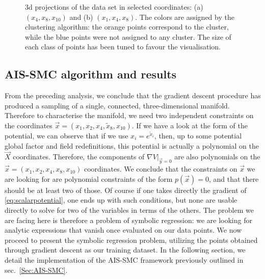 \documentclass[11pt,a4paper]{article}
\begin{document}
\begin{figure}
{
		}
		\subfigure{\label{fig:3dx1x4x8}}
		\caption{3d projections of the data set in selected coordinates: (a) $(x_4, x_8, x_{10})$ and (b) $(x_1, x_4, x_8)$. The colors are assigned by the clustering algorithm: the orange points correspond to the cluster, while the blue points were not assigned to any cluster. The size of each class of points has been tuned to favour the visualisation.}
		\label{fig:3dplots}
	\end{figure}


	\subsection{AIS-SMC algorithm and results}  \label{sec:AIS-SMC_application}
	From the preceding analysis, we conclude that the gradient descent procedure has produced a sampling of a single, connected, three-dimensional manifold. Therefore to characterise the manifold, we need two independent constraints on the coordinates $\vec{x} = (x_1,x_2,x_4,\tilde{x}_8,x_{10})$. If we have a look at the form of the potential, we can observe that if we use $x_{i} = e^{\tilde{x}_i}$, then, up to some potential global factor and field redefinitions, this potential is actually a polynomial on the $\vec{X}$ coordinates. Therefore, the components of $\left.\nabla V\right|_{\vec{y}=0}$ are also polynomials on the $\vec{x} = (x_1,x_2,x_4,x_8,x_{10})$ coordinates. We conclude that the constraints on $\vec{x}$ we are looking for are polynomial constraints of the form $p(\vec{x}) = 0$, and that there should be at least two of those. Of course if one takes directly the gradient of \eqref{eq:scalarpotential}, one ends up with such conditions, but none are usable directly to solve for two of the variables in terms of the others. The problem we are facing here is therefore a problem of symbolic regression: we are looking for analytic expressions that vanish once evaluated on our data points. We now proceed to present the symbolic regression problem, utilizing the points obtained through gradient descent as our training dataset. In the following section, we detail the implementation of the AIS-SMC framework previously outlined in sec.~\ref{Sec:AIS-SMC}.
	
\end{document}
